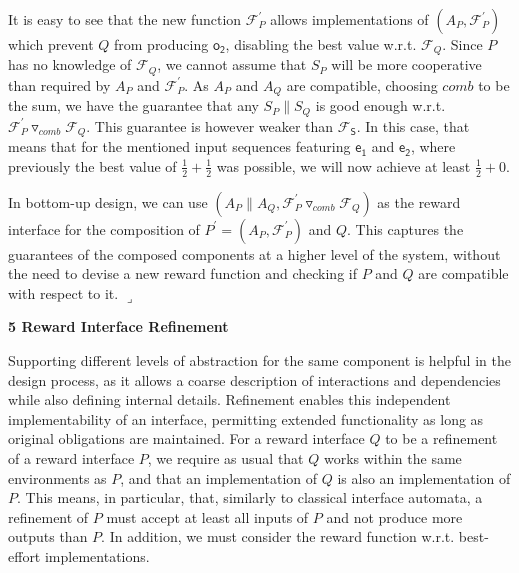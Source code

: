  
 
It is easy to see that the new function $\mathcal{F}_{P}^{\prime}$ allows implementations of $(A_{P},\mathcal{F}_{P}^{\prime})$ which prevent $Q$ from producing $\mathsf{o_{2}}$, disabling the best value w.r.t. $\mathcal{F}_{Q}$. Since $P$ has no knowledge of $\mathcal{F}_{Q}$, we cannot assume that $S_{P}$ will be more cooperative than required by $A_{P}$ and $\mathcal{F}_{P}^{\prime}$. As $A_{P}$ and $A_{Q}$ are compatible, choosing $\mathit{comb}$ to be the sum, we have the guarantee that any $S_{P}\parallel S_{Q}$ is good enough w.r.t. ${{\mathcal{F}_{P}^{\prime}}\mathbin{\triangledown_{\mathit{comb}}}{\mathcal{F}_{Q}}}$. This guarantee is however weaker than $\mathcal{F}_{\mathsf{S}}$. In this case, that means that for the mentioned input sequences featuring $\mathsf{e_{1}}$ and $\mathsf{e_{2}}$, where previously the best value of $\frac{1}{2}+\frac{1}{2}$ was possible, we will now achieve at least $\frac{1}{2}+0$.\par
 
 
 
In bottom-up design, we can use $(A_{P}\parallel A_{Q},{{\mathcal{F}_{P}^{\prime}}\mathbin{\triangledown_{\mathit{comb}}}{\mathcal{F}_{Q}}})$ as the reward interface for the composition of $P^{\prime}=(A_{P},\mathcal{F}_{P}^{\prime})$ and $Q$. This captures the guarantees of the composed components at a higher level of the system, without the need to devise a new reward function and checking if $P$ and $Q$ are compatible with respect to it. $\lrcorner$\par
 
 
 


 
\par\medskip\noindent\textbf{5 Reward Interface Refinement}\par
 
 
Supporting different levels of abstraction for the same component is helpful in the design process, as it allows a coarse description of interactions and dependencies while also defining internal details. Refinement enables this independent implementability of an interface, permitting extended functionality as long as original obligations are maintained. For a reward interface $Q$ to be a refinement of a reward interface $P$, we require as usual that $Q$ works within the same environments as $P$, and that an implementation of $Q$ is also an implementation of $P$. This means, in particular, that, similarly to classical interface automata, a refinement of $P$ must accept at least all inputs of $P$ and not produce more outputs than $P$. In addition, we must consider the reward function w.r.t. best-effort implementations.\par
 
